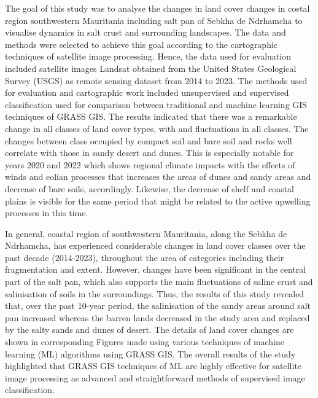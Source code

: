 \documentclass[12pt,a4paper,oneside]{article}
\def \newpar{\vspace{6pt}}
\begin{document}
\newpar The goal of this study was to analyse the changes in land cover changes in costal region southwestern Mauritania including salt pan of Sebkha de Ndrhamcha to visualise dynamics in salt crust and surrounding landscapes. The data and methods were selected to achieve this goal according to the cartographic techniques of satellite image processing. Hence, the data used for evaluation included satellite images Landsat obtained from the United States Geological Survey (USGS) as remote sensing dataset from 2014 to 2023. The methods used for evaluation and cartographic work included unsupervised and supervised classification used for comparison between traditional and machine learning GIS techniques of GRASS GIS. The results indicated that there was a remarkable change in all classes of land cover types, with and fluctuations in all classes. The changes between class occupied by compact soil and bare soil and rocks well correlate with those in sandy desert and dunes. This is especially notable for years 2020 and 2022 which shows regional climate impacts with the effects of winds and eolian processes that increases the areas of dunes and sandy areas and decrease of bare soils, accordingly. Likewise, the decrease of shelf and coastal plains is visible for the same period that might be related to the active upwelling processes in this time.

\newpar In general, coastal region of southwestern Mauritania, along the Sebkha de Ndrhamcha, has experienced considerable changes in land cover classes over the past decade (2014-2023), throughout the area of categories including their fragmentation and extent. However, changes have been significant in the central part of the salt pan, which also supports the main fluctuations of saline crust and salinisation of soils in the surroundings. Thus, the results of this study revealed that, over the past 10-year period, the salinisation of the sandy areas around salt pan increased whereas the barren lands decreased in the study area and replaced by the salty sands and dunes of desert. The details of land cover changes are shown in corresponding Figures made using various techniques of machine learning (ML) algorithms using GRASS GIS. The overall results of the study highlighted that GRASS GIS techniques of ML are highly effective for satellite image processing as advanced and straightforward methods of supervised image classification. 
\end{document}
